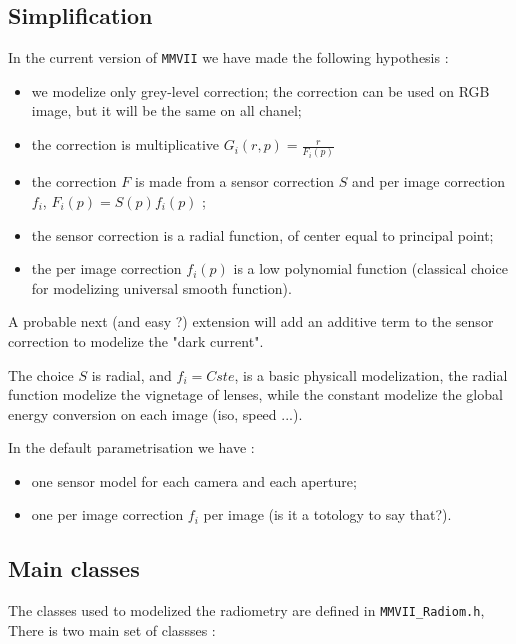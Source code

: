 \subsection{Simplification}

In the current version of {\tt MMVII} we have made the following hypothesis :

\begin{itemize}
        \item  we modelize only grey-level correction;  the correction can be used on
		RGB image, but it will be the same on all chanel;
	\item  the correction is multiplicative   $G_i(r,p) = \frac{r}{F_i(p)} $
        \item  the correction $F$ is made from a sensor correction $S$ and per image correction $f_i$,
		$F_i(p) = S(p) f_i(p)$ ;
        \item  the sensor correction is a radial function, of center equal to principal point;
	\item  the per image correction $f_i(p)$ is a low polynomial function (classical choice
		for modelizing universal smooth function).
\end{itemize}

A probable next (and easy ?)  extension will add an additive term to the sensor 
correction to modelize the "dark current".

The choice $S$ is radial, and $f_i=Cste$, is a basic physicall modelization, the radial
function modelize the vignetage of lenses, while the constant modelize the global
energy conversion on each image (iso, speed ...).

In the default parametrisation we have :

\begin{itemize}
        \item one sensor model for each camera and each aperture;
	\item one per image correction $f_i$ per image (is it a totology to say that?).
\end{itemize}

\subsection{Main classes}

The  classes used to modelized the radiometry are defined in {\tt MMVII\_Radiom.h},
There is two main set of classses :

